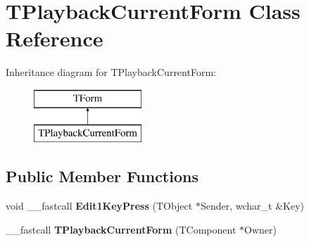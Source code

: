 \hypertarget{class_t_playback_current_form}{\section{T\+Playback\+Current\+Form Class Reference}
\label{class_t_playback_current_form}
}
Inheritance diagram for T\+Playback\+Current\+Form\+:\begin{figure}[H]
\begin{center}
\leavevmode
\includegraphics[height=2.000000cm]{class_t_playback_current_form}
\end{center}
\end{figure}
\subsection*{Public Member Functions}
\begin{DoxyCompactItemize}
\item 
\hypertarget{class_t_playback_current_form_a4563879147c51032379342cca0f409d1}{void \+\_\+\+\_\+fastcall {\bfseries Edit1\+Key\+Press} (T\+Object $\ast$Sender, wchar\+\_\+t \&Key)}\label{class_t_playback_current_form_a4563879147c51032379342cca0f409d1}

\item 
\hypertarget{class_t_playback_current_form_ae89bddd65a8d37d2f1a3930cb5536252}{\+\_\+\+\_\+fastcall {\bfseries T\+Playback\+Current\+Form} (T\+Component $\ast$Owner)}\label{class_t_playback_current_form_ae89bddd65a8d37d2f1a3930cb5536252}

\end{DoxyCompactItemize}
